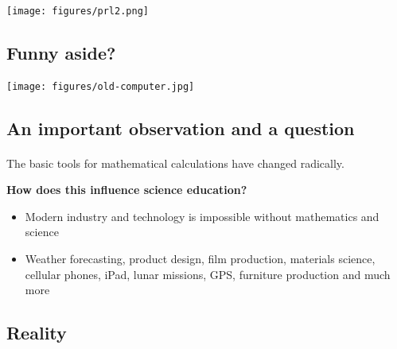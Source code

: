 \documentclass[%
twoside,                 %
final,                   %
10pt]{article}
\begin{document}
\paragraph{}


\centerline{\texttt{[image: figures/prl2.png]}}




\subsection{Funny aside?}

\paragraph{}


\centerline{\texttt{[image: figures/old-computer.jpg]}}



\subsection{An important observation and a  question}

\paragraph{}

The basic tools for mathematical calculations have changed radically.

\textbf{How does this influence science education?}

\begin{itemize}
\item Modern industry and technology is impossible without mathematics and science

\item Weather forecasting, product design, film production, materials science, cellular phones, iPad, lunar missions, GPS, furniture production and much more
\end{itemize}

\noindent




\subsection{Reality}
\end{document}
